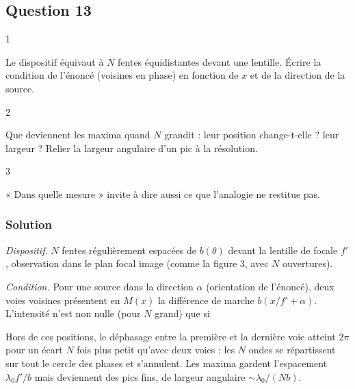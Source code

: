 \documentclass[11pt,a4paper]{article}
\newcommand{\equationajustee}[1]{%
  \sbox{\boiteequation}{$\displaystyle #1$}%
  \ifdim\wd\boiteequation>\linewidth
    \[\resizebox{\linewidth}{!}{\usebox{\boiteequation}}\]%
  \else
    \[#1\]%
  \fi}
\begin{document}
\hypertarget{question-13}{%
\subsection{Question 13}\label{question-13}}

\begin{indication}{1}

Le dispositif équivaut à \(N\) fentes équidistantes devant une lentille. Écrire la condition de l'énoncé (voisines en phase) en fonction de \(x\) et de la direction de la source.

\end{indication}

\begin{indication}{2}

Que deviennent les maxima quand \(N\) grandit : leur position change-t-elle ? leur largeur ? Relier la largeur angulaire d'un pic à la résolution.

\end{indication}

\begin{indication}{3}

« Dans quelle mesure » invite à dire aussi ce que l'analogie ne restitue pas.

\end{indication}

\hypertarget{solution-12}{%
\subsubsection{Solution}\label{solution-12}}

\emph{Dispositif.} \(N\) fentes régulièrement espacées de \(b(\theta)\) devant la lentille de focale \(f'\), observation dans le plan focal image (comme la figure 3, avec \(N\) ouvertures).

\emph{Condition.} Pour une source dans la direction \(\alpha\) (orientation de l'énoncé), deux voies voisines présentent en \(M(x)\) la différence de marche \(b(x/f'+\alpha)\). L'intensité n'est non nulle (pour \(N\) grand) que si

\equationajustee{\begin{aligned}
\frac{b(\theta)}{\lambda_0}\left(\frac{x}{f'}+\alpha\right)&=p\in\mathbb Z\\
x&=f'\left(p\frac{\lambda_0}{b(\theta)}-\alpha\right)
\end{aligned}}

Hors de ces positions, le déphasage entre la première et la dernière voie atteint \(2\pi\) pour un écart \(N\) fois plus petit qu'avec deux voies : les \(N\) ondes se répartissent sur tout le cercle des phases et s'annulent. Les maxima gardent l'espacement \(\lambda_0f'/b\) mais deviennent des pics fins, de largeur angulaire \(\sim\lambda_0/(Nb)\).
\end{document}
